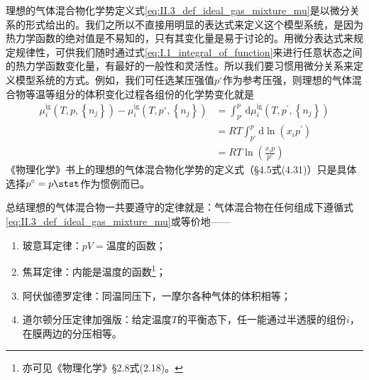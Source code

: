 \documentclass[main.tex]{subfiles}
\begin{document}
理想的气体混合物化学势定义式\eqref{eq:II.3_def_ideal_gas_mixture_mu}是以微分关系的形式给出的。我们之所以不直接用明显的表达式来定义这个模型系统，是因为热力学函数的绝对值是不易知的，只有其变化量是易于讨论的。用微分表达式来规定规律性，可供我们随时通过式\eqref{eq:I.1_integral_of_function}来进行任意状态之间的热力学函数变化量，有最好的一般性和灵活性。所以我们要习惯用微分关系来定义模型系统的方式。例如，我们可任选某压强值$p^\circ$作为参考压强，则理想的气体混合物等温等组分的体积变化过程各组份的化学势变化就是
\begin{equation}\label{eq:II.3_ideal_gas_mixture_mu_p0}
  \begin{aligned}
    \mu_i^\text{ig}\left(T,p,\left\{n_j\right\}\right)-\mu_i^\text{ig}\left(T,p^\circ,\left\{n_j\right\}\right) & =\int_{p^\circ}^p\mathrm{d}\mu_i^\text{ig}\left(T,p^\prime,\left\{n_j\right\}\right) \\
                                                                                                                & =RT\int_{p^\circ}^p\mathrm{d}\ln\left(x_ip^\prime\right)                             \\
                                                                                                                & =RT\ln\left(\frac{x_ip}{p^\circ}\right)
  \end{aligned}
\end{equation}
《物理化学》书上的理想的气体混合物化学势的定义式（\S 4.5式(4.31)）只是具体选择$p^\circ=p\stst$作为惯例而已。

总结理想的气体混合物一共要遵守的定律就是：气体混合物在任何组成下遵循式\eqref{eq:II.3_def_ideal_gas_mixture_mu}或等价地——
\begin{enumerate}
  \item 玻意耳定律：$pV=\text{温度的函数}$；
  \item 焦耳定律：内能是温度的函数\footnote{亦可见《物理化学》\S 2.8式(2.18)。}；
  \item 阿伏伽德罗定律：同温同压下，一摩尔各种气体的体积相等；
  \item 道尔顿分压定律加强版：给定温度$T$的平衡态下，任一能通过半透膜的组份$i$，在膜两边的分压相等。
\end{enumerate}
\end{document}
